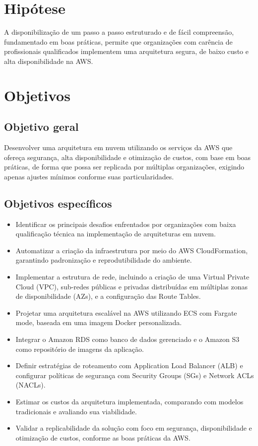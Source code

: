 \section{Hipótese}
\label{sec:intro:hip}
A disponibilização de um passo a passo estruturado e de fácil compreensão, fundamentado em boas práticas, permite que organizações com carência de profissionais qualificados implementem uma arquitetura segura, de baixo custo e alta disponibilidade na AWS.


\section{Objetivos}
\label{sec:intro:obj}



\subsection{Objetivo geral}
\label{sec:intro:obj:ger}

Desenvolver uma arquitetura em nuvem utilizando os serviços da AWS que ofereça segurança, alta disponibilidade e otimização de custos, com base em boas práticas, de forma que possa ser replicada por múltiplas organizações, exigindo apenas ajustes mínimos conforme suas particularidades.

\subsection{Objetivos específicos}
\label{sec:intro:obj:esp}

\begin{itemize}
    \item Identificar os principais desafios enfrentados por organizações com baixa qualificação técnica na implementação de arquiteturas em nuvem.
    \item Automatizar a criação da infraestrutura por meio do AWS CloudFormation, garantindo padronização e reprodutibilidade do ambiente.
    \item Implementar a estrutura de rede, incluindo a criação de uma Virtual Private Cloud (VPC), sub-redes públicas e privadas distribuídas em múltiplas zonas de disponibilidade (AZs), e a configuração das Route Tables.
     \item Projetar uma arquitetura escalável na AWS utilizando ECS com Fargate mode, baseada em uma imagem Docker personalizada.
    \item Integrar o Amazon RDS como banco de dados gerenciado e o Amazon S3 como repositório de imagens da aplicação.
    \item Definir estratégias de roteamento com Application Load Balancer (ALB) e configurar políticas de segurança com Security Groups (SGs) e Network ACLs (NACLs).
    \item Estimar os custos da arquitetura implementada, comparando com modelos tradicionais e avaliando sua viabilidade.
    \item Validar a replicabilidade da solução com foco em segurança, disponibilidade e otimização de custos, conforme as boas práticas da AWS.
\end{itemize}


